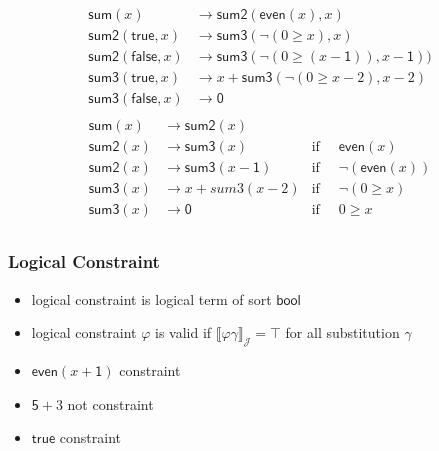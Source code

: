 \documentclass[12pt,aspectratio=169]{beamer}
\newcommand{\m}[1]{\mathsf{#1}}
\newcommand{\JJ}{\mathcal{J}}
\begin{document}
\begin{frame}
        \begin{align*}
        \m{sum}(x) &\to \m{sum2}(\m{even}(x),x) \\
        \m{sum2}(\m{true}, x) &\to \m{sum3}(\neg(0 \geq x), x) \\
        \m{sum2}(\m{false}, x) &\to \m{sum3}(\neg(0 \geq (x-\m{1})), x - \m{1}))\\
        \m{sum3}(\m{true}, x) &\to x + \m{sum3}(\neg(0 \geq x-2), x-2) \\
        \m{sum3}(\m{false},x) &\to \m{0}\\
        \end{align*}
        \vspace{-10mm}
        \begin{align*}
            \m{sum}(x) &\to \m{sum2}(x) &\\
            \m{sum2}(x) &\to \m{sum3}(x) & \text{if} & \;\; \m{even}(x)\\
            \m{sum2}(x) &\to \m{sum3}(x-\m{1}) & \text{if} & \;\; \neg(\m{even}(x))\\
            \m{sum3}(x) &\to x + {sum3}(x-2) & \text{if} & \;\; \neg(0 \geq x)  \\
            \m{sum3}(x) &\to \m{0} & \text{if} & \;\;0 \geq x \\
        \end{align*}
\end{frame}

\begin{frame}
    \frametitle{Logical Constraint}
    \begin{definition}
        \begin{itemize}
            \item \alert{logical constraint} is logical term of sort \alert{$\m{bool}$} %
        \item logical constraint $\varphi$ is \alert{valid} if $\llbracket \varphi\gamma \rrbracket_\JJ = \top$ for all substitution $\gamma$
        \end{itemize}
    \end{definition}
    \begin{example}
        \begin{itemize}
            \item $\m{even}(x + \m{1})$ \quad constraint
            \item $\m{5} + {3}$ \quad not constraint
            \item $\m{true}$ \quad constraint
        \end{itemize}
    \end{example}

\end{frame}
\end{document}
